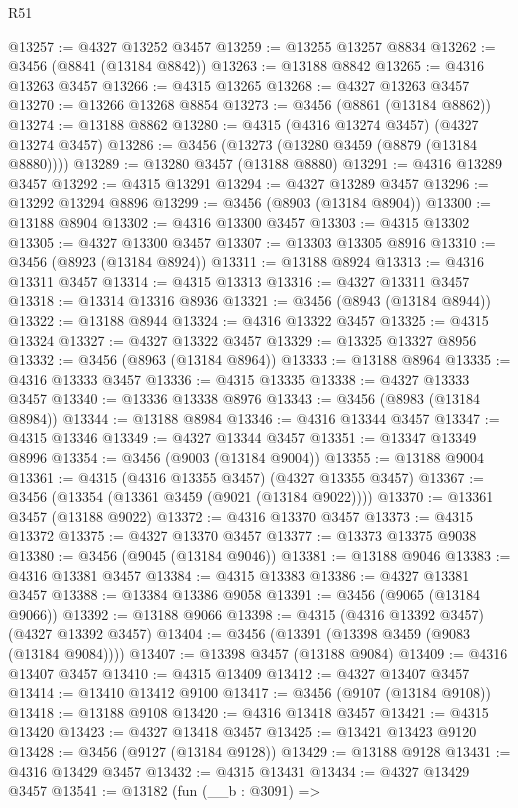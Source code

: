 \begin{lexlean}{R51}
\begin{coremodule}
@13257 := @4327 @13252 @3457
@13259 := @13255 @13257 @8834
@13262 := @3456 (@8841 (@13184 @8842))
@13263 := @13188 @8842
@13265 := @4316 @13263 @3457
@13266 := @4315 @13265
@13268 := @4327 @13263 @3457
@13270 := @13266 @13268 @8854
@13273 := @3456 (@8861 (@13184 @8862))
@13274 := @13188 @8862
@13280 := @4315 (@4316 @13274 @3457) (@4327 @13274 @3457)
@13286 := @3456 (@13273 (@13280 @3459 (@8879 (@13184 @8880))))
@13289 := @13280 @3457 (@13188 @8880)
@13291 := @4316 @13289 @3457
@13292 := @4315 @13291
@13294 := @4327 @13289 @3457
@13296 := @13292 @13294 @8896
@13299 := @3456 (@8903 (@13184 @8904))
@13300 := @13188 @8904
@13302 := @4316 @13300 @3457
@13303 := @4315 @13302
@13305 := @4327 @13300 @3457
@13307 := @13303 @13305 @8916
@13310 := @3456 (@8923 (@13184 @8924))
@13311 := @13188 @8924
@13313 := @4316 @13311 @3457
@13314 := @4315 @13313
@13316 := @4327 @13311 @3457
@13318 := @13314 @13316 @8936
@13321 := @3456 (@8943 (@13184 @8944))
@13322 := @13188 @8944
@13324 := @4316 @13322 @3457
@13325 := @4315 @13324
@13327 := @4327 @13322 @3457
@13329 := @13325 @13327 @8956
@13332 := @3456 (@8963 (@13184 @8964))
@13333 := @13188 @8964
@13335 := @4316 @13333 @3457
@13336 := @4315 @13335
@13338 := @4327 @13333 @3457
@13340 := @13336 @13338 @8976
@13343 := @3456 (@8983 (@13184 @8984))
@13344 := @13188 @8984
@13346 := @4316 @13344 @3457
@13347 := @4315 @13346
@13349 := @4327 @13344 @3457
@13351 := @13347 @13349 @8996
@13354 := @3456 (@9003 (@13184 @9004))
@13355 := @13188 @9004
@13361 := @4315 (@4316 @13355 @3457) (@4327 @13355 @3457)
@13367 := @3456 (@13354 (@13361 @3459 (@9021 (@13184 @9022))))
@13370 := @13361 @3457 (@13188 @9022)
@13372 := @4316 @13370 @3457
@13373 := @4315 @13372
@13375 := @4327 @13370 @3457
@13377 := @13373 @13375 @9038
@13380 := @3456 (@9045 (@13184 @9046))
@13381 := @13188 @9046
@13383 := @4316 @13381 @3457
@13384 := @4315 @13383
@13386 := @4327 @13381 @3457
@13388 := @13384 @13386 @9058
@13391 := @3456 (@9065 (@13184 @9066))
@13392 := @13188 @9066
@13398 := @4315 (@4316 @13392 @3457) (@4327 @13392 @3457)
@13404 := @3456 (@13391 (@13398 @3459 (@9083 (@13184 @9084))))
@13407 := @13398 @3457 (@13188 @9084)
@13409 := @4316 @13407 @3457
@13410 := @4315 @13409
@13412 := @4327 @13407 @3457
@13414 := @13410 @13412 @9100
@13417 := @3456 (@9107 (@13184 @9108))
@13418 := @13188 @9108
@13420 := @4316 @13418 @3457
@13421 := @4315 @13420
@13423 := @4327 @13418 @3457
@13425 := @13421 @13423 @9120
@13428 := @3456 (@9127 (@13184 @9128))
@13429 := @13188 @9128
@13431 := @4316 @13429 @3457
@13432 := @4315 @13431
@13434 := @4327 @13429 @3457
@13541 := @13182
    (fun (__b : @3091) =>

\end{coremodule}
\end{lexlean}
